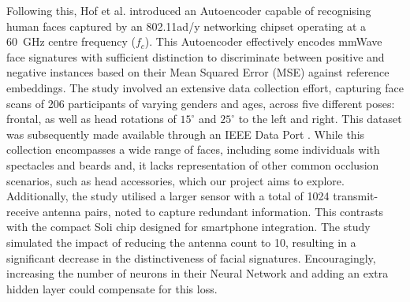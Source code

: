 \documentclass{mpaper}
\begin{document}
Following this, Hof et al. \cite{hof2020face} introduced an Autoencoder capable of recognising human faces captured by an 802.11ad/y networking chipset operating at a \qty{60}{\GHz} centre frequency ($f_c$). This Autoencoder effectively encodes mmWave face signatures with sufficient distinction to discriminate between positive and negative instances based on their Mean Squared Error (MSE) against reference embeddings. The study involved an extensive data collection effort, capturing face scans of 206 participants of varying genders and ages, across five different poses: frontal, as well as head rotations of $15^\circ$ and $25^\circ$ to the left and right. This dataset was subsequently made available through an IEEE Data Port \cite{mmwavefacedata}. While this collection encompasses a wide range of faces, including some individuals with spectacles and beards and, it lacks representation of other common occlusion scenarios, such as head accessories, which our project aims to explore. Additionally, the study utilised a larger sensor with a total of 1024 transmit-receive antenna pairs, noted to capture redundant information. This contrasts with the compact Soli chip designed for smartphone integration. The study simulated the impact of reducing the antenna count to 10, resulting in a significant decrease in the distinctiveness of facial signatures. Encouragingly, increasing the number of neurons in their Neural Network and adding an extra hidden layer could compensate for this loss.
\end{document}
